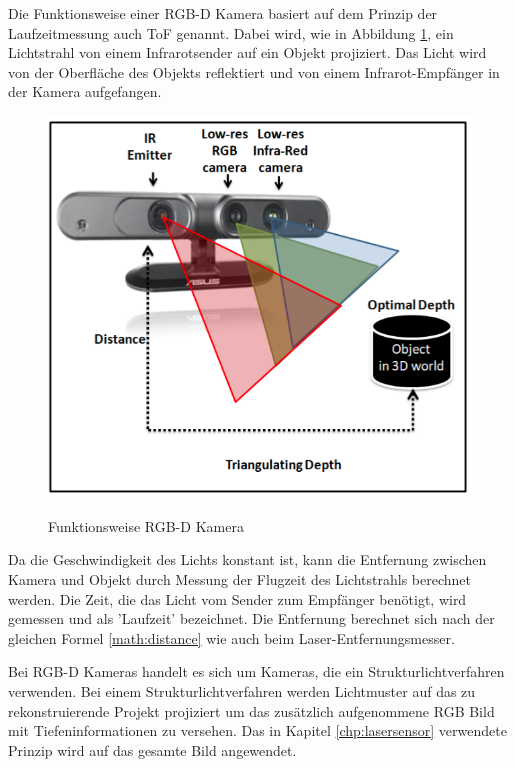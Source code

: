     Die Funktionsweise einer \ac{RGB-D} Kamera basiert auf dem Prinzip der Laufzeitmessung auch \ac{ToF} genannt.  Dabei wird, wie in Abbildung \ref{fig:rgbd}, ein Lichtstrahl von einem Infrarotsender auf ein Objekt projiziert. Das Licht wird von der Oberfläche des Objekts reflektiert und von einem Infrarot-Empfänger in der Kamera aufgefangen.

    \begin{figure}
        \includegraphics[width=\textwidth]{./images/rgbd-camera-ref.png}
        \label{fig:rgbd}\caption{Funktionsweise RGB-D Kamera\cite[vgl. ][Abbildung 7]{SWB-165930377X}}
    \end{figure}
    
    Da die Geschwindigkeit des Lichts konstant ist, kann die Entfernung zwischen Kamera und Objekt durch Messung der Flugzeit des Lichtstrahls berechnet werden.
    Die Zeit, die das Licht vom Sender zum Empfänger benötigt, wird gemessen und als 'Laufzeit' bezeichnet.
    Die Entfernung berechnet sich nach der gleichen Formel \ref{math:distance} wie auch beim Laser-Entfernungsmesser. 


    Bei \ac{RGB-D} Kameras handelt es sich um Kameras, die ein Strukturlichtverfahren verwenden.
    Bei einem Strukturlichtverfahren werden Lichtmuster auf das zu rekonstruierende Projekt projiziert um das zusätzlich aufgenommene RGB Bild mit Tiefeninformationen zu versehen. Das in Kapitel \ref{chp:lasersensor} verwendete Prinzip wird auf das gesamte Bild angewendet. 
    
